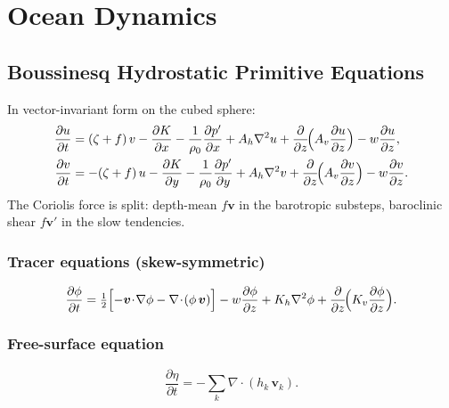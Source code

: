 \documentclass[11pt,a4paper]{article}
\newcommand{\pp}{\partial}
\newcommand{\half}{\tfrac{1}{2}}
\begin{document}
\section{Ocean Dynamics}

\subsection{Boussinesq Hydrostatic Primitive Equations}

In vector-invariant form on the cubed sphere:
\begin{align}
  \frac{\pp u}{\pp t} &= (\zeta+f)\,v - \frac{\pp K}{\pp x} - \frac{1}{\rho_0}\frac{\pp p'}{\pp x} + A_h\nabla^2 u + \frac{\pp}{\pp z}\!\Bigl(A_v\frac{\pp u}{\pp z}\Bigr) - w\frac{\pp u}{\pp z}, \\
  \frac{\pp v}{\pp t} &= -(\zeta+f)\,u - \frac{\pp K}{\pp y} - \frac{1}{\rho_0}\frac{\pp p'}{\pp y} + A_h\nabla^2 v + \frac{\pp}{\pp z}\!\Bigl(A_v\frac{\pp v}{\pp z}\Bigr) - w\frac{\pp v}{\pp z}.
\end{align}
The Coriolis force is split: depth-mean $f\bm v$ in the barotropic substeps, baroclinic shear $f\bm v'$ in the slow tendencies.

\subsubsection{Tracer equations (skew-symmetric)}
\begin{equation}
  \frac{\pp\phi}{\pp t} = \half\Bigl[-\bm v\!\cdot\!\nabla\phi - \nabla\!\cdot\!(\phi\,\bm v)\Bigr]
  - w\frac{\pp\phi}{\pp z} + K_h\nabla^2\phi + \frac{\pp}{\pp z}\!\Bigl(K_v\frac{\pp\phi}{\pp z}\Bigr).
\end{equation}

\subsubsection{Free-surface equation}
\begin{equation}
  \frac{\pp\eta}{\pp t} = -\sum_k \nabla\!\cdot\!(h_k\,\bm v_k).
\end{equation}

\end{document}
